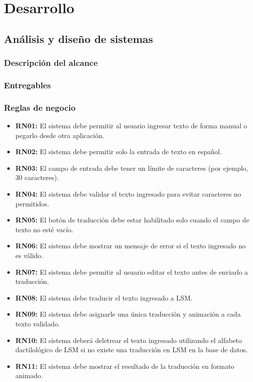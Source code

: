 \chapter{Desarrollo}
\section{Análisis y diseño de sistemas}
\subsection{Descripción del alcance}
\subsection{Entregables}
\subsection{Reglas de negocio}
\begin{itemize}[leftmargin=1.5cm]
    \item \textbf{RN01:} El sistema debe permitir al usuario ingresar texto de forma manual o pegarlo desde otra aplicación.
    \item \textbf{RN02:} El sistema debe permitir solo la entrada de texto en español.
    \item \textbf{RN03:} El campo de entrada debe tener un límite de caracteres (por ejemplo, 30 caracteres).
    \item \textbf{RN04:} El sistema debe validar el texto ingresado para evitar caracteres no permitidos.
    \item \textbf{RN05:} El botón de traducción debe estar habilitado solo cuando el campo de texto no esté vacío.
    \item \textbf{RN06:} El sistema debe mostrar un mensaje de error si el texto ingresado no es válido.
    \item \textbf{RN07:} El sistema debe permitir al usuario editar el texto antes de enviarlo a traducción.
    \item \textbf{RN08:} El sistema debe traducir el texto ingresado a LSM.
    \item \textbf{RN09:} El sistema debe asignarle una única traducción y animación a cada texto validado.
    \item \textbf{RN10:} El sistema deberá deletrear el texto ingresado utilizando el alfabeto dactilológico de LSM si no existe una traducción en LSM en la base de datos.
    \item \textbf{RN11:} El sistema debe mostrar el resultado de la traducción en formato animado.
\end{itemize}

